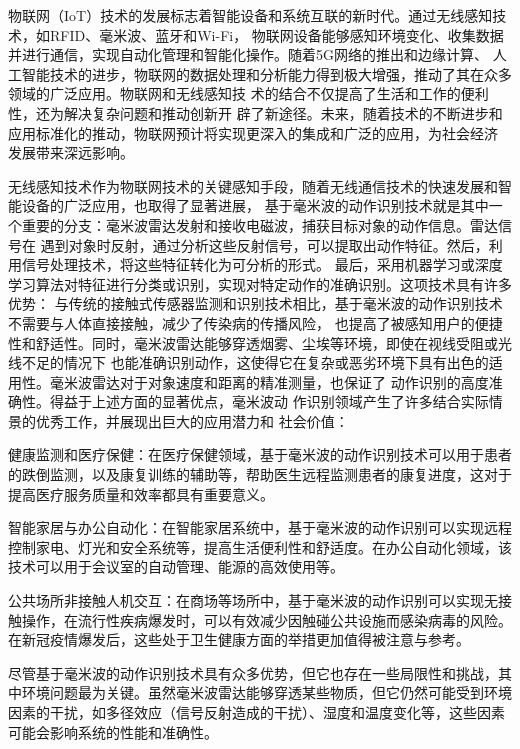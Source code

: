 \xiaosi



物联网（IoT）技术的发展标志着智能设备和系统互联的新时代。通过无线感知技术，如RFID、毫米波、蓝牙和Wi-Fi，
物联网设备能够感知环境变化、收集数据并进行通信，实现自动化管理和智能化操作。随着5G网络的推出和边缘计算、
人工智能技术的进步，物联网的数据处理和分析能力得到极大增强，推动了其在众多领域的广泛应用。物联网和无线感知技
术的结合不仅提高了生活和工作的便利性，还为解决复杂问题和推动创新开
辟了新途径。未来，随着技术的不断进步和应用标准化的推动，物联网预计将实现更深入的集成和广泛的应用，为社会经济
发展带来深远影响。

无线感知技术作为物联网技术的关键感知手段，随着无线通信技术的快速发展和智能设备的广泛应用，也取得了显著进展，
基于毫米波的动作识别技术\cite{zhang2023survey}就是其中一个重要的分支：毫米波雷达发射和接收电磁波，捕获目标对象的动作信息。雷达信号在
遇到对象时反射，通过分析这些反射信号，可以提取出动作特征。然后，利用信号处理技术，将这些特征转化为可分析的形式。
最后，采用机器学习或深度学习算法对特征进行分类或识别，实现对特定动作的准确识别。这项技术具有许多优势：
与传统的接触式传感器监测和识别技术相比，基于毫米波的动作识别技术不需要与人体直接接触，减少了传染病的传播风险，
也提高了被感知用户的便捷性和舒适性。同时，毫米波雷达能够穿透烟雾、尘埃等环境，即使在视线受阻或光线不足的情况下
也能准确识别动作，这使得它在复杂或恶劣环境下具有出色的适用性。毫米波雷达对于对象速度和距离的精准测量，也保证了
动作识别的高度准确性。得益于上述方面的显著优点，毫米波动
作识别领域产生了许多结合实际情景的优秀工作\cite{li2019bi,an2021mars,liu2020real}，并展现出巨大的应用潜力和
社会价值：

健康监测和医疗保健：在医疗保健领域，基于毫米波的动作识别技术可以用于患者的跌倒监测，以及康复训练的辅助等，帮助医生远程监测患者的康复进度，这对于提高医疗服务质量和效率都具有重要意义。

智能家居与办公自动化：在智能家居系统中，基于毫米波的动作识别可以实现远程控制家电、灯光和安全系统等，提高生活便利性和舒适度。在办公自动化领域，该技术可以用于会议室的自动管理、能源的高效使用等。

公共场所非接触人机交互：在商场等场所中，基于毫米波的动作识别可以实现无接触操作，在流行性疾病爆发时，可以有效减少因触碰公共设施而感染病毒的风险。在新冠疫情爆发后，这些处于卫生健康方面的举措更加值得被注意与参考。

尽管基于毫米波的动作识别技术具有众多优势，但它也存在一些局限性和挑战，其中环境问题最为关键。虽然毫米波雷达能够穿透某些物质，但它仍然可能受到环境
因素的干扰，如多径效应（信号反射造成的干扰）、湿度和温度变化等，这些因素可能会影响系统的性能和准确性。

